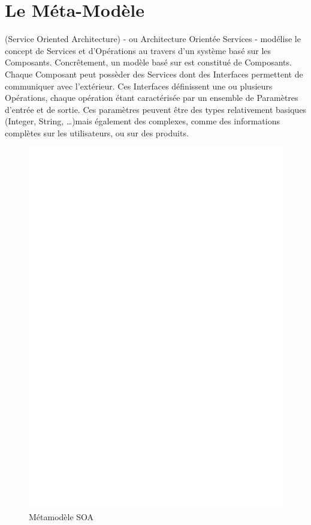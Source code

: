 \section{Le Méta-Modèle \kwsoa}\label{sub:soa}

\kwsoa{} (Service Oriented Architecture) - ou Architecture Orientée Services - modélise le concept de Services et d'Opérations au travers d'un système basé sur les Composants. Concrêtement, un modèle basé sur \kwsoa est constitué de Composants. Chaque Composant peut possèder des Services dont des Interfaces permettent de communiquer avec l'extérieur. Ces Interfaces définissent une ou plusieurs Opérations, chaque opération étant caractérisée par un ensemble de Paramètres d'entrée et de sortie. Ces paramètres peuvent être des types relativement basiques (Integer, String, \dots)mais également des  complexes, comme des informations complètes sur les utilisateurs, ou sur des produits.	

\begin{figure}[htb]
  \centering
  \includegraphics[scale=.3]{img/SOA.eps}
  \caption{Métamodèle SOA}
  \label{fig:soa}
\end{figure}

